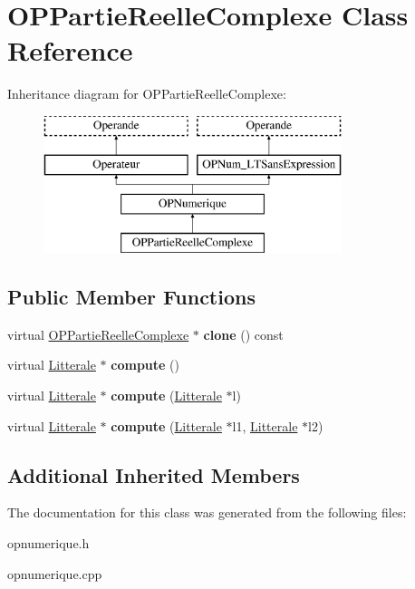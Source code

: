 \hypertarget{class_o_p_partie_reelle_complexe}{}\section{O\+P\+Partie\+Reelle\+Complexe Class Reference}
\label{class_o_p_partie_reelle_complexe}
Inheritance diagram for O\+P\+Partie\+Reelle\+Complexe\+:\begin{figure}[H]
\begin{center}
\leavevmode
\includegraphics[height=4.000000cm]{class_o_p_partie_reelle_complexe}
\end{center}
\end{figure}
\subsection*{Public Member Functions}
\begin{DoxyCompactItemize}
\item 
virtual \hyperlink{class_o_p_partie_reelle_complexe}{O\+P\+Partie\+Reelle\+Complexe} $\ast$ {\bfseries clone} () const \hypertarget{class_o_p_partie_reelle_complexe_ab0b419202cefa7f4bd0940faafb15e1b}{}\label{class_o_p_partie_reelle_complexe_ab0b419202cefa7f4bd0940faafb15e1b}

\item 
virtual \hyperlink{class_litterale}{Litterale} $\ast$ {\bfseries compute} ()\hypertarget{class_o_p_partie_reelle_complexe_a1ef3a295a6b3b6aa1474f62d128b8239}{}\label{class_o_p_partie_reelle_complexe_a1ef3a295a6b3b6aa1474f62d128b8239}

\item 
virtual \hyperlink{class_litterale}{Litterale} $\ast$ {\bfseries compute} (\hyperlink{class_litterale}{Litterale} $\ast$l)\hypertarget{class_o_p_partie_reelle_complexe_a39c7ccd465c93592ef49d9695081efbd}{}\label{class_o_p_partie_reelle_complexe_a39c7ccd465c93592ef49d9695081efbd}

\item 
virtual \hyperlink{class_litterale}{Litterale} $\ast$ {\bfseries compute} (\hyperlink{class_litterale}{Litterale} $\ast$l1, \hyperlink{class_litterale}{Litterale} $\ast$l2)\hypertarget{class_o_p_partie_reelle_complexe_ab43515992604e136042404626cea2dcb}{}\label{class_o_p_partie_reelle_complexe_ab43515992604e136042404626cea2dcb}

\end{DoxyCompactItemize}
\subsection*{Additional Inherited Members}


The documentation for this class was generated from the following files\+:\begin{DoxyCompactItemize}
\item 
opnumerique.\+h\item 
opnumerique.\+cpp\end{DoxyCompactItemize}
